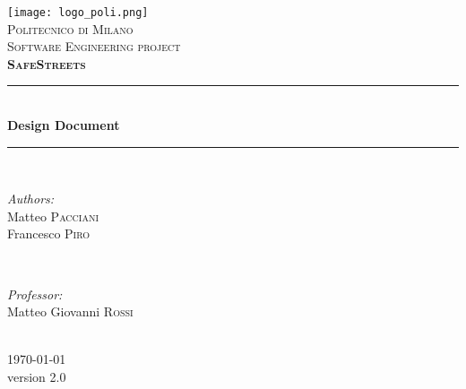 \begin{titlepage}
	
\newcommand{\HRule}{\rule{\linewidth}{0.5mm}}
\centering

\texttt{[image: logo\_poli.png]}\\[0.5cm]
\textsc{\LARGE Politecnico di Milano}\\[2cm]
\textsc{\Large Software Engineering  project}\\[0.5cm]
\textsc{\LARGE \textbf{SafeStreets}}\\[1.5cm]

\HRule \\[0.4cm]
{ \huge \bfseries Design Document}\\[0.4cm] %
\HRule \\[1.5cm]

\begin{minipage}{0.4\textwidth}
	\begin{flushleft} \large
		\emph{Authors:}\\
		Matteo \textsc{Pacciani}\\
		Francesco \textsc{Piro}\\
	\end{flushleft}
\end{minipage}
~
\begin{minipage}{0.4\textwidth}
	\begin{flushright} \large
		\emph{Professor:} \\
		Matteo Giovanni \textsc{Rossi} %
	\end{flushright}
\end{minipage}\\[2cm]

{\large \today}\\[0.5cm] %
{\large version 2.0}\\[2cm]

\vfill
\clearpage

\end{titlepage}